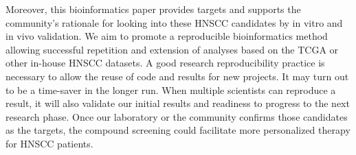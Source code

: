 \documentclass[jpm,article,submit,moreauthors,pdftex]{Definitions/mdpi}
\begin{document}
\begin{paracol}{2}
Moreover, this bioinformatics paper provides targets and supports the community's rationale for looking into these HNSCC candidates by in vitro and in vivo validation. %
We aim to promote a reproducible bioinformatics\cite{Preeyanon2014}\cite{Kulkarni2018} method allowing successful repetition and extension of analyses based on the TCGA or other in-house HNSCC datasets. %
A good research reproducibility practice is necessary to allow the reuse of code and results for new projects.
It may turn out to be a time-saver in the longer run.
When multiple scientists can reproduce a result, it will also validate our initial results and readiness to progress to the next research phase. 
Once our laboratory or the community confirms those candidates as the targets, the compound screening\cite{Yang2004}\cite{Hsu2011}\cite{Pathak2021} could facilitate more personalized therapy for HNSCC patients.








\end{paracol}
\end{document}
